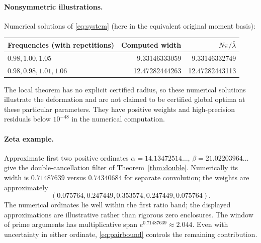 \documentclass[11pt]{article}
\theoremstyle{remark}\newtheorem{remark}[theorem]{Remark}
\begin{document}
\paragraph{Nonsymmetric illustrations.} Numerical solutions of \eqref{eq:system} (here in the equivalent original moment basis):
\begin{center}
\begin{tabular}{@{}lrr@{}}
\toprule
Frequencies (with repetitions)&Computed width&$N\pi/\bar\lambda$\\
\midrule
$0.98,1.00,1.05$&9.33146333059&9.33146332749\\
$0.98,0.98,1.01,1.06$&12.47282444263&12.47282443113\\
\bottomrule
\end{tabular}
\end{center}
The local theorem has no explicit certified radius, so these numerical solutions illustrate the deformation and are not claimed to be certified global optima at these particular parameters. They have positive weights and high-precision residuals below $10^{-48}$ in the numerical computation.

\paragraph{Zeta example.} Approximate first two positive ordinates $\alpha=14.13472514\ldots$, $\beta=21.02203964\ldots$ give the double-cancellation filter of Theorem~\ref{thm:double}. Numerically its width is $0.71487639$ versus $0.74340684$ for separate convolution; the weights are approximately
\[ (0.075764,0.247449,0.353574,0.247449,0.075764). \]
The numerical ordinates lie well within the first ratio band; the displayed approximations are illustrative rather than rigorous zero enclosures. The window of prime arguments has multiplicative span $e^{0.71487639}\approx2.044$. Even with uncertainty in either ordinate, \eqref{eq:pairbound} controls the remaining contribution.
\end{document}
